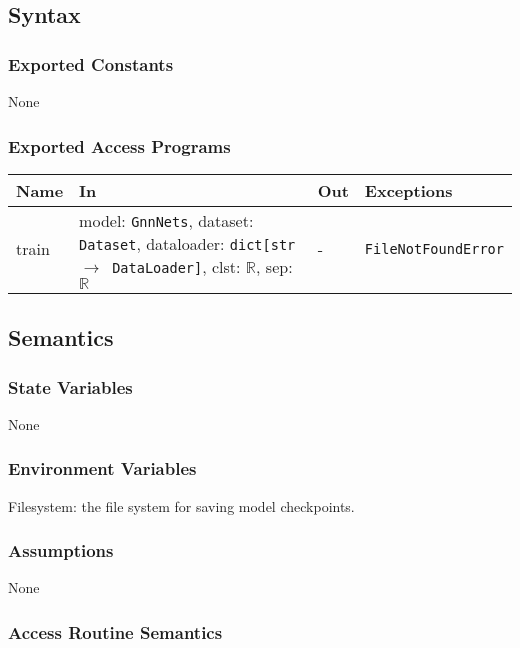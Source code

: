 \documentclass[12pt, titlepage]{article}
\begin{document}
\subsection{Syntax}

\subsubsection{Exported Constants}
None

\subsubsection{Exported Access Programs}

\begin{center}
\begin{tabular}{p{2cm} p{6cm} p{4cm} p{3.5cm}}
\hline
\textbf{Name} & \textbf{In} & \textbf{Out} & \textbf{Exceptions} \\
\hline
train & model: \texttt{GnnNets}, dataset: \texttt{Dataset}, dataloader: \texttt{dict[str \(\rightarrow\) DataLoader]}, clst: \(\mathbb{R}\), sep: \(\mathbb{R}\) & - & \texttt{FileNotFoundError} \\
\hline
\end{tabular}
\end{center}

\subsection{Semantics}

\subsubsection{State Variables}
None

\subsubsection{Environment Variables}
Filesystem: the file system for saving model checkpoints.

\subsubsection{Assumptions}
None

\subsubsection{Access Routine Semantics}
\end{document}
